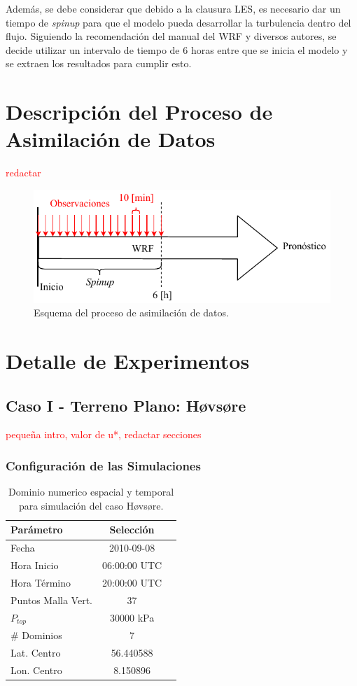 Además, se debe considerar que debido a la clausura LES, es necesario dar un tiempo de \emph{spinup} para que el modelo pueda desarrollar la turbulencia dentro del flujo. Siguiendo la recomendación del manual del WRF y diversos autores, se decide utilizar un intervalo de tiempo de 6 horas entre que se inicia el modelo y se extraen los resultados para cumplir esto.

\newpage
\section{Descripción del Proceso de Asimilación de Datos}
\textcolor{red}{redactar}
\begin{figure}[H]
	\centering
		\includegraphics[width=0.85\linewidth,page=1,trim={0cm 0cm 0cm 0cm},clip]{Imagenes/05/da}%
	\caption{Esquema del proceso de asimilación de datos.}
	\label{fig:05_da}
\end{figure}

\newpage
\section{Detalle de Experimentos}
\subsection{Caso I - Terreno Plano: Høvsøre}
\textcolor{red}{pequeña intro, valor de u*, redactar secciones}
\subsubsection{Configuración de las Simulaciones}
\begin{table}[h!]
	\caption{Dominio numerico espacial y temporal para simulación del caso Høvsøre.}\label{tab:05_config_hov}
	\centering\footnotesize
	\begin{tabular}{lcc}
		\toprule
		Parámetro & Selección \\
		\midrule
		Fecha	 	 & 2010-09-08   \\
		Hora Inicio	 	 & 06:00:00   UTC \\
		Hora Término	 		 & 20:00:00 UTC  \\
		Puntos Malla Vert.	 	 & 37   \\
		$P_{top}$ 	& 30000 kPa\\
		\# Dominios	& 7   \\
		Lat. Centro	& 56.440588   \\
		Lon. Centro	& 8.150896   \\
		\bottomrule
	\end{tabular}
\end{table}

